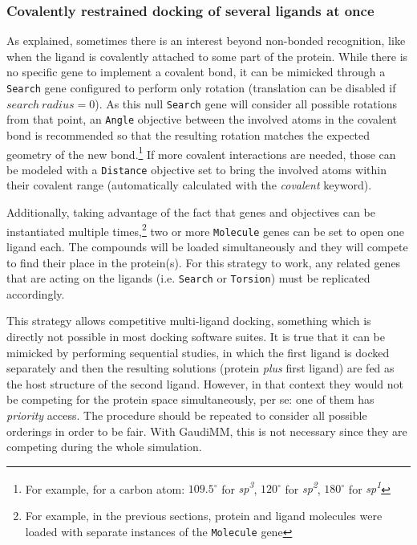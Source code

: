 \subsubsection{Covalently restrained docking of several ligands at once}
\label{section:multidocking}

As explained, sometimes there is an interest beyond non-bonded recognition, like when the ligand is covalently attached to some part of the protein. While there is no specific gene to implement a covalent bond, it can be mimicked through a \texttt{Search} gene configured to perform only rotation (translation can be disabled if $search~radius=0$). As this null \texttt{Search} gene will consider all possible rotations from that point, an \texttt{Angle} objective between the involved atoms in the covalent bond is recommended so that the resulting rotation matches the expected geometry of the new bond.\footnote{For example, for a carbon atom: $109.5^{\circ}$ for \textit{sp\textsuperscript{3}}, $120^{\circ}$ for \textit{sp\textsuperscript{2}}, $180^{\circ}$ for \textit{sp\textsuperscript{1}}} If more covalent interactions are needed, those can be modeled with a \texttt{Distance} objective set to bring the involved atoms within their covalent range (automatically calculated with the \textit{covalent} keyword).

Additionally, taking advantage of the fact that genes and objectives can be instantiated multiple times,\footnote{For example, in the previous sections, protein and ligand molecules were loaded with separate instances of the \texttt{Molecule} gene} two or more \texttt{Molecule} genes can be set to open one ligand each. The compounds will be loaded simultaneously and they will compete to find their place in the protein(s). For this strategy to work, any related genes that are acting on the ligands (i.e. \texttt{Search} or \texttt{Torsion}) must be replicated accordingly.

This strategy allows competitive multi-ligand docking, something which is directly not possible in most docking software suites. It is true that it can be mimicked by performing sequential studies, in which the first ligand is docked separately and then the resulting solutions (protein \textit{plus} first ligand) are fed as the host structure of the second ligand. However, in that context they would not be competing for the protein space simultaneously, per se: one of them has \textit{priority} access. The procedure should be repeated to consider all possible orderings in order to be fair. With GaudiMM, this is not necessary since they are competing during the whole simulation.

